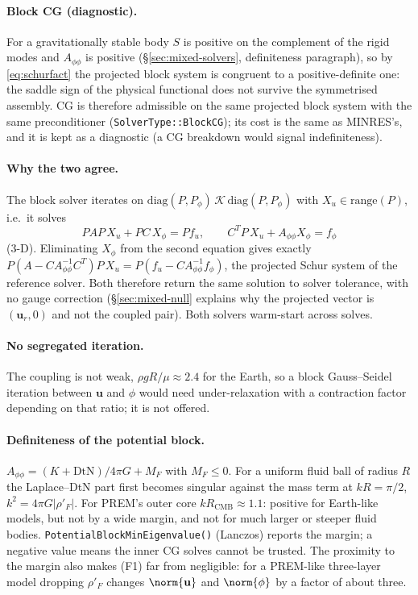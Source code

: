 \documentclass[11pt]{article}
\numberwithin{equation}{section}
\theoremstyle{remark}
\newcommand{\DtN}{\mathrm{DtN}}
\newcommand{\vu}{\mathbf{u}}
\newcommand{\code}[1]{\texttt{#1}}
\begin{document}
\paragraph{Block CG (diagnostic).} For a gravitationally stable body $S$ is
positive on the complement of the rigid modes and $A_{\phi\phi}$ is
positive (\S\ref{sec:mixed-solvers}, definiteness paragraph), so by
\eqref{eq:schurfact} the projected block system is congruent to a
positive-definite one: the saddle sign of the physical functional does not
survive the symmetrised assembly. CG is therefore admissible on the same
projected block system with the same preconditioner
(\code{SolverType::BlockCG}); its cost is the same as MINRES's, and
it is kept as a diagnostic (a CG breakdown would signal indefiniteness).

\paragraph{Why the two agree.} The block solver iterates on
$\mathrm{diag}(P,P_\phi)\,\mathcal{K}\,\mathrm{diag}(P,P_\phi)$ with
$X_u\in\mathrm{range}(P)$, i.e.\ it solves
\[
  PAP\,X_u + PC\,X_\phi = Pf_u, \qquad C^TP\,X_u + A_{\phi\phi}X_\phi = f_\phi
\]
(3-D). Eliminating $X_\phi$ from the second equation gives exactly
$P(A - CA_{\phi\phi}^{-1}C^T)P\,X_u = P(f_u - CA_{\phi\phi}^{-1}f_\phi)$,
the projected Schur system of the reference solver. Both therefore return
the same solution to solver tolerance, with no gauge correction
(\S\ref{sec:mixed-null} explains why the projected vector is $(\vu_r, 0)$
and not the coupled pair). Both solvers warm-start across solves.

\paragraph{No segregated iteration.} The coupling is not weak,
$\rho g R/\mu \approx 2.4$ for the Earth, so a block Gauss--Seidel iteration
between $\vu$ and $\phi$ would need under-relaxation with a contraction
factor depending on that ratio; it is not offered.

\paragraph{Definiteness of the potential block.} $A_{\phi\phi} = (K +
\DtN)/4\pi G + M_F$ with $M_F \le 0$. For a uniform fluid ball of radius
$R$ the Laplace--DtN part first becomes singular against the mass term at
$kR = \pi/2$, $k^2 = 4\pi G|\rho'_F|$. For PREM's outer core
$k R_{\mathrm{CMB}} \approx 1.1$: positive for Earth-like models, but not
by a wide margin, and not for much larger or steeper fluid bodies.
\code{PotentialBlockMinEigenvalue()} (Lanczos) reports the margin; a
negative value means the inner CG solves cannot be trusted. The proximity
to the margin also makes (F1) far from negligible: for a PREM-like
three-layer model dropping $\rho'_F$ changes $\norm{\vu}$ and
$\norm{\phi}$ by a factor of about three.
\end{document}
